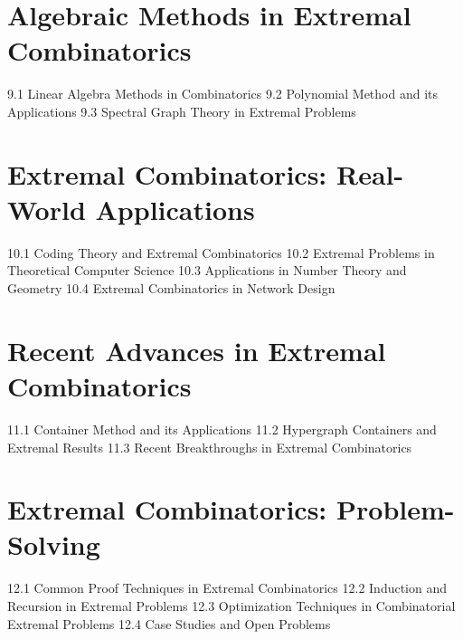 \section{Algebraic Methods in Extremal Combinatorics}
9.1 Linear Algebra Methods in Combinatorics
9.2 Polynomial Method and its Applications
9.3 Spectral Graph Theory in Extremal Problems
\section{Extremal Combinatorics: Real-World Applications}
10.1 Coding Theory and Extremal Combinatorics
10.2 Extremal Problems in Theoretical Computer Science
10.3 Applications in Number Theory and Geometry
10.4 Extremal Combinatorics in Network Design
\section{Recent Advances in Extremal Combinatorics}
11.1 Container Method and its Applications
11.2 Hypergraph Containers and Extremal Results
11.3 Recent Breakthroughs in Extremal Combinatorics
\section{Extremal Combinatorics: Problem-Solving}
12.1 Common Proof Techniques in Extremal Combinatorics
12.2 Induction and Recursion in Extremal Problems
12.3 Optimization Techniques in Combinatorial Extremal Problems
12.4 Case Studies and Open Problems

